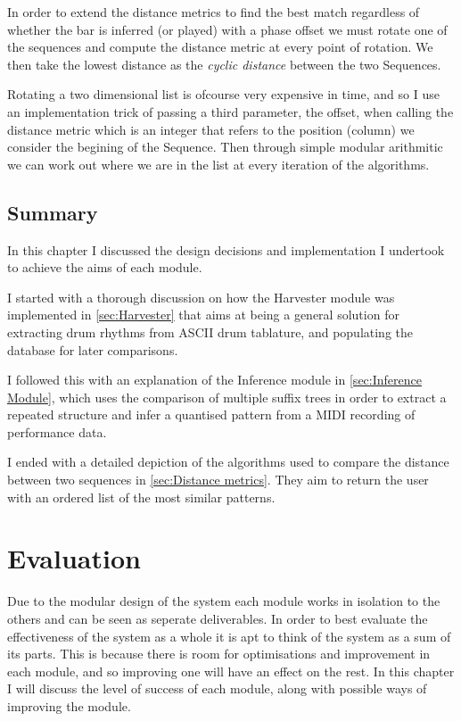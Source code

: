 \documentclass[12pt,twoside,notitlepage]{report}
\begin{document}
		In order to extend the distance metrics to find the best match regardless of whether the bar is inferred (or played) with a phase offset we must rotate one of the sequences and compute the distance metric at every point of rotation. We then take the lowest distance as the \emph{cyclic distance} between the two Sequences.
		
		Rotating a two dimensional list is ofcourse very expensive in time, and so I use an implementation trick of passing a third parameter, the offset, when calling the distance metric which is an integer that refers to the position (column) we consider the begining of the Sequence. Then through simple modular arithmitic we can work out where we are in the list at every iteration of the algorithms.
		
	\section{Summary}
	In this chapter I discussed the design decisions and implementation I undertook to achieve the aims of each module. 
	
	I started with a thorough discussion on how the Harvester module was implemented in \ref{sec:Harvester} that aims at being a general solution for extracting drum rhythms from ASCII drum tablature, and populating the database for later comparisons.
	
	I followed this with an explanation of the Inference module in \ref{sec:Inference Module}, which uses the comparison of multiple suffix trees in order to extract a repeated structure and infer a quantised pattern from a MIDI recording of performance data.
	
	I ended with a detailed depiction of the algorithms used to compare the distance between two sequences in \ref{sec:Distance metrics}. They aim to return the user with an ordered list of the most similar patterns.

\cleardoublepage
\chapter{Evaluation}

	Due to the modular design of the system each module works in isolation to the others and can be seen as seperate deliverables. In order to best evaluate the effectiveness of the system as a whole it is apt to think of the system as a sum of its parts. This is because there is room for optimisations and improvement in each module, and so improving one will have an effect on the rest. In this chapter I will discuss the level of success of each module, along with possible ways of improving the module.
	
\end{document}

